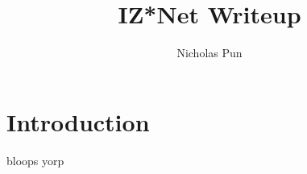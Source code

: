 \documentclass[11pt]{article}
\title{IZ*Net Writeup}
\author{Nicholas Pun}
\begin{document}
\maketitle
{\small \tableofcontents}
{\small \listofmystery}
 
\section{Introduction}


\blindtext[15]


\begin{mystery}{bloops}
    yorp
\end{mystery}


\clearpage
\nocite{*}


\end{document}
